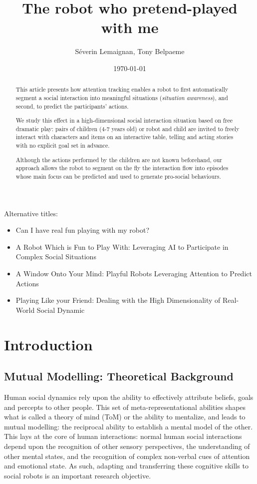 \documentclass[a4paper]{article}
\title{The robot who pretend-played with me}
\author{Séverin Lemaignan, Tony Belpaeme}
\date{\today}
\begin{document}
\maketitle

Alternative titles:

\begin{itemize}
    \item Can I have real fun playing with my robot?
    \item A Robot Which is Fun to Play With: Leveraging AI to Participate in Complex
        Social Situations
    \item A Window Onto Your Mind: Playful Robots Leveraging Attention to
        Predict Actions
    \item Playing Like your Friend: Dealing with the High Dimensionality of
        Real-World Social Dynamic

\end{itemize}

\begin{abstract}

    This article presents how attention tracking enables a robot to first automatically segment
    a social interaction into meaningful situations (\emph{situation awareness}), and
    second, to predict the participants' actions.

    We study this effect in a high-dimensional social interaction situation based on
    free dramatic play: pairs of children (4-7 years old) or robot and child are
    invited to freely interact with characters and items on an interactive
    table, telling and acting stories with no explicit goal set in advance.

    Although the actions performed by the children are not known beforehand, our
    approach allows the robot to segment on the fly the interaction flow into
    episodes whose main focus can be predicted and used to generate pro-social
    behaviours.

\end{abstract}


\section{Introduction}

\subsection{Mutual Modelling: Theoretical Background}

Human social dynamics rely upon the ability to effectively attribute beliefs,
goals and percepts to other people. This set of meta-representational abilities
shapes what is called a theory of mind (ToM) or the ability to mentalize, and
leads to mutual modelling: the reciprocal ability to establish a mental model of
the other. This lays at the core of human interactions: normal human social
interactions depend upon the recognition of other sensory perspectives, the
understanding of other mental states, and the recognition of complex non-verbal
cues of attention and emotional state. As such, adapting and transferring these
cognitive skills to social robots is an important research objective.
\end{document}
